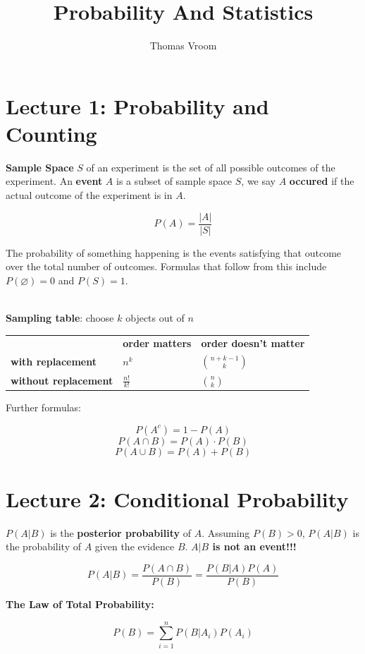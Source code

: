 \documentclass[12pt]{article}
\title{Probability And Statistics}
\author{Thomas Vroom}
\begin{document}
\maketitle
{}

%
%
\section*{Lecture 1: Probability and Counting}
\textbf{Sample Space} $S$ of an experiment is the set of all possible outcomes of the experiment.
An \textbf{event} $A$ is a subset of sample space $S$, we say $A$ \textbf{occured} if the actual outcome of the experiment is in $A$.

\[ P(A) = \frac{|A|}{|S|} \]

\noindent
The probability of something happening is the events satisfying that outcome over the total number of outcomes.
Formulas that follow from this include $P(\varnothing) = 0$ and $P(S) = 1$.

\noindent
\\
\textbf{Sampling table}: choose $k$ objects out of $n$

\begin{table}[h]
    \centering
    \begin{tabular}{lll}
    & \textbf{order matters} & \textbf{order doesn't matter} \\
    \textbf{with replacement} & $n^k$ & $\binom{n+k-1}{k}$ \\
    \textbf{without replacement} & $\frac{n!}{k!}$ & $\binom{n}{k}$
    \end{tabular}
\end{table}

\noindent
Further formulas:

\[ P(A^c) = 1 - P(A) \]
\[ P(A \cap B) = P(A) \cdot P(B) \]
\[ P(A \cup B) = P(A) + P(B) \]

%
%
\section*{Lecture 2: Conditional Probability}
$P(A|B)$ is the \textbf{posterior probability} of $A$.
Assuming $P(B) > 0$, $P(A|B)$ is the probability of $A$ given the evidence $B$.
\textbf{$A|B$ is not an event!!!}

\[ P(A|B) = \frac{P(A \cap B)}{P(B)} = \frac{P(B|A)P(A)}{P(B)} \]

\noindent
\textbf{The Law of Total Probability:}

\[ P(B) = \sum_{i = 1}^{n} P(B|A_i)P(A_i) \]
\end{document}
